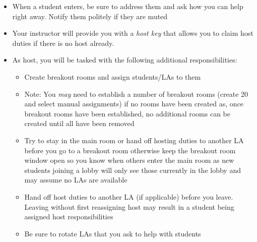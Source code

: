 \documentclass[12pt]{scrartcl}
\begin{document}
\begin{itemize}
  \item When a student enters, be sure to address them and ask how you can help right away.  Notify them politely if they are muted
  \item Your instructor will provide you with a \emph{host key} that allows you to claim host duties if there is no host already.
  \item As host, you will be tasked with the following additional responsibilities:
  \begin{itemize}
    \item Create breakout rooms and assign students/LAs to them
    \item Note: You \emph{may} need to establish a number of breakout rooms (create 20 and select manual assignments) if no rooms have been created as, once breakout rooms have been established, no additional rooms can be created until all have been removed
    \item Try to stay in the main room or hand off hosting duties to another LA before you go to a breakout room otherwise keep the breakout room window open so you know when others enter the main room as new students joining a lobby will only see those currently in the lobby and may assume no LAs are available
    \item Hand off host duties to another LA (if applicable) before you leave. Leaving without first reassigning host may result in a student being assigned host responsibilities
    \item Be sure to rotate LAs that you ask to help with students
  \end{itemize}
\end{itemize}
\end{document}
